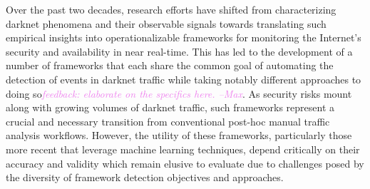 \documentclass[manuscript,nonacm]{acmart}
\newcommand{\maxnote}[1]{\textit{\textcolor{violet}{#1 --Max}}}
\begin{document}
Over the past two decades, research efforts have shifted from characterizing darknet phenomena and their observable signals towards translating such empirical insights into operationalizable frameworks for monitoring the Internet's security and availability in near real-time.  
This has led to the development of a number of frameworks that each share the common goal of automating the detection of events in darknet traffic while taking notably different approaches to doing so\maxnote{feedback: elaborate on the specifics here.}.
As security risks mount along with growing volumes of darknet traffic, such frameworks represent a crucial and necessary transition from conventional post-hoc manual traffic analysis workflows.
However, the utility of these frameworks, particularly those more recent that leverage machine learning techniques, depend critically on their accuracy and validity which remain elusive to evaluate due to challenges posed by the diversity of framework detection objectives and approaches.



\end{document}
